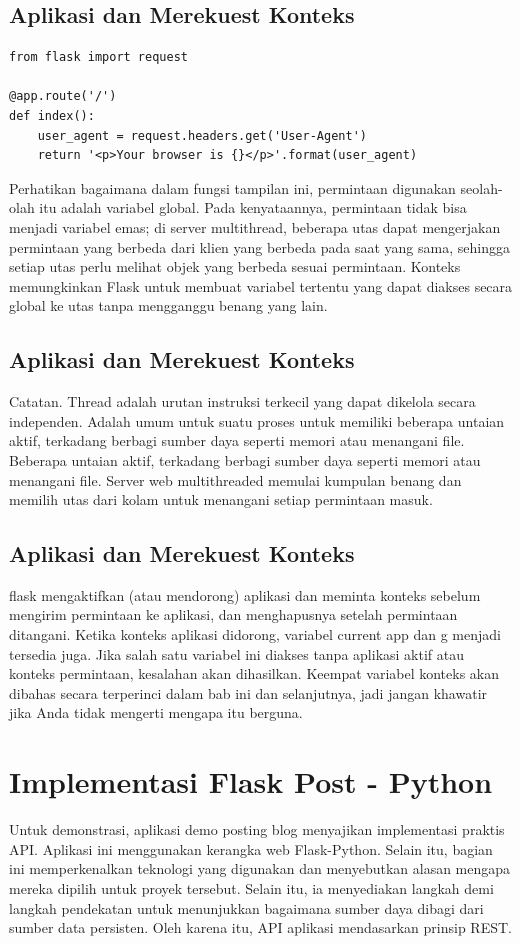 \subsection{Aplikasi dan Merekuest Konteks}
\begin{verbatim}
from flask import request

@app.route('/')
def index():
	user_agent = request.headers.get('User-Agent')
	return '<p>Your browser is {}</p>'.format(user_agent)
\end{verbatim}
Perhatikan bagaimana dalam fungsi tampilan ini, permintaan digunakan seolah-olah itu adalah variabel global. Pada kenyataannya, permintaan tidak bisa menjadi variabel emas; di server multithread, beberapa utas dapat mengerjakan permintaan yang berbeda dari klien yang berbeda pada saat yang sama, sehingga setiap utas perlu melihat objek yang berbeda sesuai permintaan. Konteks memungkinkan Flask untuk membuat variabel tertentu yang dapat diakses secara global ke utas tanpa mengganggu benang yang lain\cite{grinberg2018flask}.

\subsection{Aplikasi dan Merekuest Konteks}
Catatan.
Thread adalah urutan instruksi terkecil yang dapat dikelola secara independen. Adalah umum untuk suatu proses untuk memiliki beberapa untaian aktif, terkadang berbagi sumber daya seperti memori atau menangani file. Beberapa untaian aktif, terkadang berbagi sumber daya seperti memori atau menangani file. Server web multithreaded memulai kumpulan benang dan memilih utas dari kolam untuk menangani setiap permintaan masuk\cite{grinberg2018flask}.

\subsection{Aplikasi dan Merekuest Konteks}
flask mengaktifkan (atau mendorong) aplikasi dan meminta konteks sebelum mengirim permintaan ke aplikasi, dan menghapusnya setelah permintaan ditangani. Ketika konteks aplikasi didorong, variabel current app dan g menjadi tersedia juga. Jika salah satu variabel ini diakses tanpa aplikasi aktif atau konteks permintaan, kesalahan akan dihasilkan. Keempat variabel konteks akan dibahas secara terperinci dalam bab ini dan selanjutnya, jadi jangan khawatir jika Anda tidak mengerti mengapa itu berguna\cite{grinberg2018flask}.



\section{Implementasi Flask Post - Python}
Untuk demonstrasi, aplikasi demo posting blog menyajikan implementasi praktis API. Aplikasi ini menggunakan kerangka web Flask-Python. Selain itu, bagian ini memperkenalkan teknologi yang digunakan dan menyebutkan alasan mengapa mereka dipilih untuk proyek tersebut. Selain itu, ia menyediakan langkah demi langkah pendekatan untuk menunjukkan bagaimana sumber daya dibagi dari sumber data persisten. Oleh karena itu, API aplikasi mendasarkan prinsip REST\cite{alemu2014rest}.

